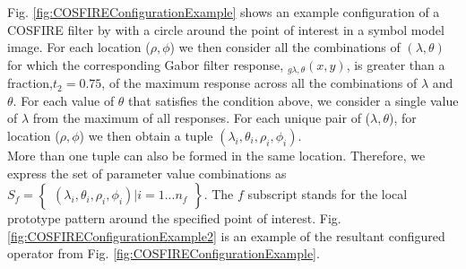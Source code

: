 Fig. \ref{fig:COSFIREConfigurationExample} shows an example configuration of a COSFIRE filter by with a circle around the point of interest in a symbol model image. For each location ($\rho,\phi$) we then consider all the combinations of $(\lambda, \theta)$ for which the corresponding Gabor filter response, $_{g\lambda,\theta}(x,y)$, is greater than a fraction,$t_{2}=0.75$, of the maximum response across all the combinations of $\lambda$ and $\theta$.
For each value of $\theta$ that satisfies the condition above, we consider a single value of $\lambda$ from the maximum of all responses. For each unique pair of ($\lambda, \theta$), for location ($\rho,\phi$) we then obtain a tuple $( \lambda_{i}, \theta_{i}, \rho_{i}, \phi_{i} )$. \\

More than one tuple can also be formed in the same location. Therefore, we express the set of parameter value combinations as $S_f= \begin{Bmatrix}( \lambda_{i}, \theta_{i}, \rho_{i}, \phi_{i} ) | i=1...n_{f} \end{Bmatrix}$. The $f$ subscript stands for the local prototype pattern around the specified point of interest. Fig. \ref{fig:COSFIREConfigurationExample2} is an example of the resultant configured operator from Fig. \ref{fig:COSFIREConfigurationExample}.

